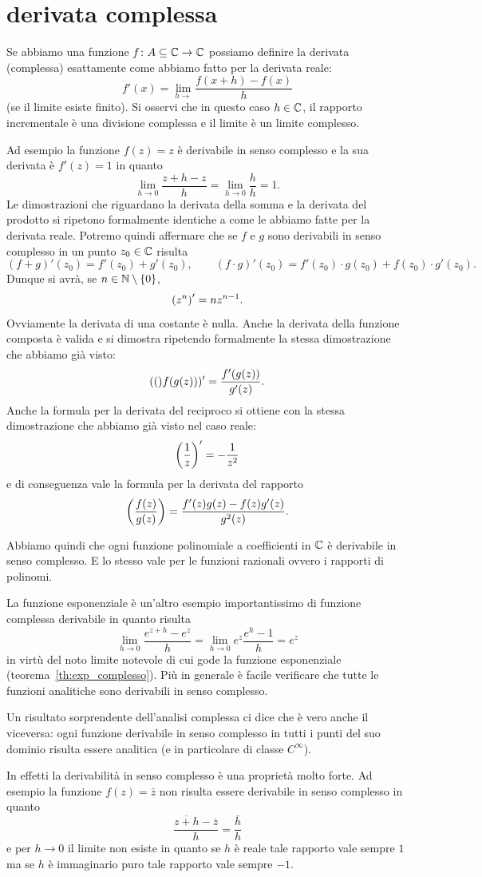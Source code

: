 \section{derivata complessa}
\label{sec:derivata_complessa}

Se abbiamo una funzione $f\colon A\subseteq \mathbb C \to \mathbb C$
possiamo definire la derivata (complessa) esattamente
come abbiamo fatto per la derivata reale:
\[
  f'(x) = \lim_{h\to} \frac{f(x+h)-f(x)}{h}
\]
(se il limite esiste finito).
Si osservi che in questo caso $h\in \mathbb C$,
il rapporto incrementale è una divisione complessa
e il limite è un limite complesso.

Ad esempio la funzione $f(z)=z$ è derivabile
in senso complesso e la sua derivata è $f'(z) = 1$
in quanto
\[
  \lim_{h\to 0} \frac{z+h-z}{h} = \lim_{h\to 0} \frac{h}{h}=1.
\]
Le dimostrazioni che riguardano la derivata della somma
e la derivata del prodotto si ripetono formalmente identiche
a come le abbiamo fatte per la derivata reale.
Potremo quindi affermare che se $f$ e $g$ sono derivabili
in senso complesso in un punto $z_0\in \mathbb C$ risulta
\[
  (f+g)'(z_0) = f'(z_0) + g'(z_0), \qquad
  (f\cdot g)'(z_0) = f'(z_0)\cdot g(z_0) + f(z_0)\cdot g'(z_0).
\]
Dunque si avrà, se $n\in \mathbb N\setminus{\left\{ 0 \right\}}$,
\[
  {\left( z^n \right)}' = n z^{n-1}.
\]
Ovviamente la derivata di una costante è nulla.
Anche la derivata della funzione composta è valida e si
dimostra ripetendo formalmente la stessa dimostrazione che
abbiamo già visto:
\[
  {\left( ( \right)}f(g(z)))'  = \frac{f'(g(z))}{g'(z)}.
\]
Anche la formula per la derivata del reciproco si ottiene
con la stessa dimostrazione che abbiamo già visto nel caso
reale:
\[
  {\left( \frac 1 z \right)}' = - \frac{1}{z^2}
\]
e di conseguenza vale la formula per la derivata del rapporto
\[
{\left( \frac{f(z)}{g(z)} \right)} = \frac{f'(z)g(z) - f(z) g'(z)}{g^2(z)}.
\]

Abbiamo quindi che ogni funzione polinomiale a coefficienti in $\mathbb C$
è derivabile in senso complesso.
E lo stesso vale per le funzioni razionali ovvero i rapporti
di polinomi.

La funzione esponenziale è un'altro esempio importantissimo
di funzione complessa derivabile in quanto risulta
\[
  \lim_{h\to 0} \frac{e^{z+h}-e^z}{h}
  = \lim_{h\to 0} e^z \frac{e^h-1}{h} = e^z
\]
in virtù del noto limite notevole di cui
gode la funzione esponenziale
(teorema~\ref{th:exp_complesso}).
Più in generale è facile verificare che tutte le funzioni
analitiche sono derivabili in senso complesso.

Un risultato sorprendente dell'analisi complessa ci dice
che è vero anche il viceversa: ogni funzione
derivabile in senso complesso in tutti i punti del suo
dominio risulta essere analitica (e in particolare di classe
$C^\infty$).

In effetti la derivabilità in senso complesso è una proprietà
molto forte. Ad esempio la funzione $f(z) = \bar z$
non risulta essere derivabile in senso complesso in quanto
\[
\frac{\overline{z+h}-\overline z}{h} = \frac{\bar h}{h}
\]
e per $h\to 0$ il limite non esiste in quanto se
$h$ è reale tale rapporto vale sempre $1$
ma se $h$ è immaginario puro tale rapporto vale sempre $-1$.
